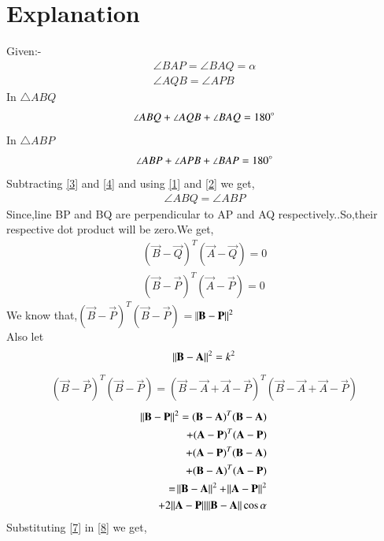 \documentclass[journal,12pt,twocolumn]{IEEEtran}
\begin{document}
\section{Explanation}
Given:-
\begin{align}
  \angle{BAP}=\angle{BAQ}=\alpha\label{1}\\ 
    \angle{AQB}=\angle{APB}\label{2}
\end{align}
In $\triangle ABQ$
\begin{align}
    \angle{ABQ} + \angle{AQB} + \angle{BAQ}=180\degree\label{3}
\end{align}
In $\triangle ABP$
\begin{align}
    \angle{ABP} + \angle{APB} + \angle{BAP}=180\degree\label{4}
\end{align}
Subtracting \eqref{3} and \eqref{4} and using \eqref{1} and \eqref{2} we get,
\begin{align}
\angle{ABQ}=\angle{ABP}
\end{align}
Since,line BP and BQ are perpendicular to AP and AQ respectively..So,their respective dot product will be zero.We get,
\begin{align}
    (\vec{B}-\vec{Q})^T(\vec{A}-\vec{Q})=0\label{5}\\
    (\vec{B}-\vec{P})^T(\vec{A}-\vec{P})=0\label{6}
\end{align}
We know that,$(\vec{B}-\vec{P})^T(\vec{B}-\vec{P})$ = $\norm{\mathbf{B}-\mathbf{P}}^2$\\
 Also let
 \begin{align}
 \norm{\mathbf{B}-\mathbf{A}}^2 = k^2\label{7}
 \end{align}
\begin{align}
(\vec{B}-\vec{P})^T(\vec{B}-\vec{P})=(\vec{B}-\vec{A}+\vec{A}-\vec{P})^T(\vec{B}-\vec{A}+\vec{A}-\vec{P})
\end{align}
\begin{align}
 \begin{split}
\norm{\mathbf{B}-\mathbf{P}}^2=(\mathbf{B}-\mathbf{A})^T(\mathbf{B}-\mathbf{A})\\
+(\mathbf{A}-\mathbf{P})^T(\mathbf{A}-\mathbf{P})\\
+(\mathbf{A}-\mathbf{P})^T(\mathbf{B}-\mathbf{A})\\
+(\mathbf{B}-\mathbf{A})^T(\mathbf{A}-\mathbf{P})\\
=\norm{\mathbf{B}-\mathbf{A}}^2 + \norm{\mathbf{A}-\mathbf{P}}^2\\ 
  + 2\norm{\mathbf{A}-\mathbf{P}}\norm{\mathbf{B}-\mathbf{A}}\cos\alpha\label{8}
  \end{split}
\end{align}
Substituting \eqref{7} in \eqref{8} we get,\\
\end{document}
